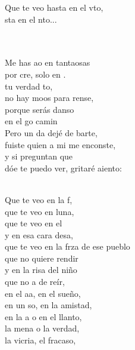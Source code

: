 \documentclass[12pt]{article}
\begin{document}
\begin{multicols*}{2}
\begin{cancion}
\begin{chorus}
	Que te veo hasta en el vto, \\
	sta en el nto...\\
	\end{chorus}%
	\jump\\
	   \\
	Me has ao en tantaosas \\
	por cre, solo en . \\
	 tu verdad to, \\
	no hay moos para rense,\\
	porque  serás danso \\
	en el go camin\\
\jump
	Pero un da dejé de barte, \\
	fuiste  quien a mi me enconste, \\
	y si  preguntan que \\
	dóe te puedo ver, gritaré aiento:\\\jump\\
	\begin{chorus}%
	Que te veo en la f, \\
	que te veo en luna,\\
	que te veo en el  \\
	y en esa cara desa,\\
	que te veo en la frza de ese pueblo\\
	que no  quiere rendir\\
	y en la risa del niño \\
	que no a de reír,\\
	en el aa, en el sueño, \\
	en un so, en la amistad,\\
	en la a o en el llanto, \\
	la mena o la verdad,\\
	la vicria, el fracaso, \\

\end{chorus}
\end{cancion}
\end{multicols*}
\end{document}
